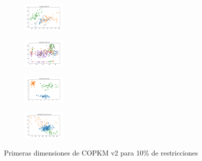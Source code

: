 \begin{figure}[H]
\begin{subfigure}
    \end{subfigure}
    \hfill
    \begin{subfigure}
        \centering
        \includegraphics[width=0.234\textwidth]{img/copkm2/iris_set_const_10_3773969821_clust.png}
    \end{subfigure}
    \hfill
    \begin{subfigure}
        \centering
        \includegraphics[width=0.234\textwidth]{img/copkm2/ecoli_set_const_10_3773969821_clust.png}
    \end{subfigure}
    \hfill
    \begin{subfigure}
        \centering
        \includegraphics[width=0.234\textwidth]{img/copkm2/rand_set_const_10_3773969821_clust.png}
    \end{subfigure}
    \hfill
    \begin{subfigure}
        \centering
        \includegraphics[width=0.234\textwidth]{img/copkm2/newthyroid_set_const_10_3773969821_clust.png}
    \end{subfigure}
    \caption{Primeras dimensiones de COPKM v2 para 10\% de restricciones}
\end{figure}

\vspace*{\fill}
\newpage
\vspace*{\fill}

